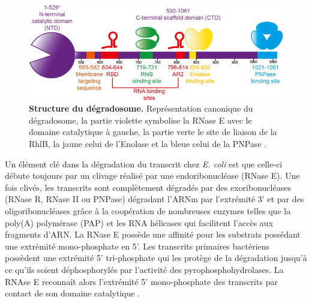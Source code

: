 \documentclass[12pt,a4paper]{report}
\begin{document}
\begin{onehalfspace}
\begin{figure}[ht]
\centerline{\includegraphics[scale=4]{figures/degradosome.jpg}}
\caption{\textbf{Structure du dégradosome.} Représentation canonique du dégradosome, la partie violette symbolise la RNase E avec le domaine catalytique à gauche, la partie verte le site de liaison de la RhlB, la jaune celui de l'Enolase et la bleue celui de la PNPase \citep{Bandyra2013}.}
\label{fig:degradosome} 
\end{figure}

Un élément clé dans la dégradation du transcrit chez \textit{E. coli} est que celle-ci débute toujours par un clivage réalisé par une endoribonucléase (RNase E). Une fois clivés, les transcrits sont complètement dégradés par des exoribonucléases (RNase R, RNase II ou PNPase) dégradant l'ARNm par l'extrémité 3' et par des oligoribonucléases grâce à la coopération de nombreuses enzymes telles que la poly(A) polymérase (PAP) et les RNA hélicases qui facilitent l'accès aux fragments d'ARN. La RNase E possède une affinité pour les substrats possédant une extrémité mono-phosphate en 5'. Les transcrits primaires bactériens possèdent une extrémité 5' tri-phosphate qui les protège de la dégradation jusqu'à ce qu'ils soient déphosphorylés par l'activité des pyrophosphohydrolases. La RNAse E reconnaît alors l'extrémité 5' mono-phosphate des transcrits par contact de son domaine catalytique \citep{Callaghan2005,Bandyra2013}.


\end{onehalfspace}
\end{document}
